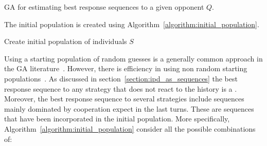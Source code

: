 \begin{algorithm}[!htbp]
    \SetAlgoLined
     \caption{GA for estimating best response sequences to a given opponent \(Q\).}\label{algorithm:genetic_algorithm}
\end{algorithm}

The initial population is created using Algorithm~\ref{algorithm:initial_population}.

\begin{algorithm}[!htbp]
    \SetAlgoLined

 \caption{Create initial population of individuals \(S\)}\label{algorithm:initial_population}
\end{algorithm}

Using a starting population of random guesses is a generally common approach in
the GA literature~\cite{Hou1994}. However, there is efficiency in using non
random starting populations~\cite{Drezner2005, Osaba2014}.
As discussed in section~\ref{section:ipd_as_sequences} the best response sequence
to any strategy that does not react to the history is a \Defector. Moreover,
the best response sequence to several strategies include sequences mainly dominated
by cooperation expect in the last turns. These are
sequences that have been incorporated in the initial population. More specifically,
Algorithm~\ref{algorithm:initial_population} consider all the possible combinations
of:

